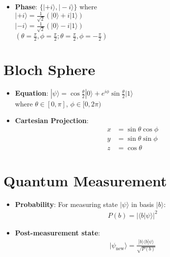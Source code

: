 \begin{multicols}{3}
\begin{itemize}[leftmargin=*,nosep,topsep=0pt]
      \item \textbf{Phase}: $\{|+i\rangle, |-i\rangle\}$ where\\
        $|+i\rangle = \frac{1}{\sqrt{2}}(|0\rangle + i|1\rangle)$\\
        $|-i\rangle = \frac{1}{\sqrt{2}}(|0\rangle - i|1\rangle)$\\
        $(\theta=\frac{\pi}{2}, \phi=\frac{\pi}{2}; \theta=\frac{\pi}{2},
        \phi=-\frac{\pi}{2})$
    \end{itemize}

    \section*{Bloch Sphere}
    \begin{itemize}[leftmargin=*,nosep,topsep=0pt]
      \item \textbf{Equation}: $|\psi\rangle = \cos\frac{\theta}{2}|0\rangle +
        e^{i\phi}\sin\frac{\theta}{2}|1\rangle$\\
        where $\theta \in [0,\pi]$, $\phi \in [0,2\pi)$

      \item \textbf{Cartesian Projection}:
        \begin{align*}
          x &= \sin\theta\cos\phi\\
          y &= \sin\theta\sin\phi\\
          z &= \cos\theta
        \end{align*}

    \end{itemize}

    \section*{Quantum Measurement}
    \begin{itemize}[leftmargin=*,nosep,topsep=0pt]
      \item \textbf{Probability}: For measuring state $|\psi\rangle$ in basis
        $|b\rangle$:
        \begin{align*}
          P(b) = |\langle b|\psi\rangle|^2
        \end{align*}

      \item \textbf{Post-measurement state}:
        \begin{align*}
          |\psi_{\text{new}}\rangle = \frac{|b\rangle\langle
          b|\psi\rangle}{\sqrt{P(b)}}
        \end{align*}


\end{itemize}
\end{multicols}
